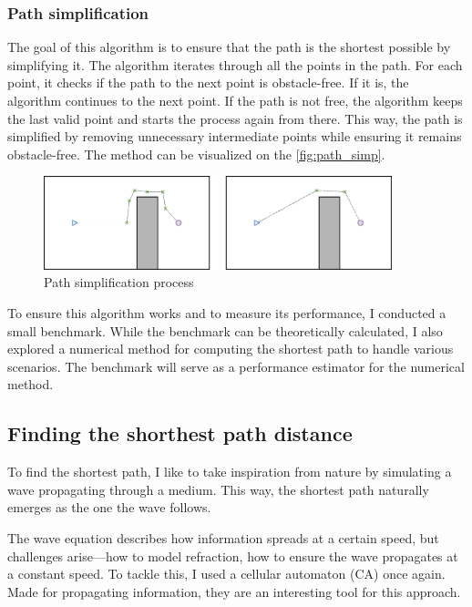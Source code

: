 \documentclass[../main.tex]{subfiles}
\begin{document}
\subsubsection{Path simplification}

The goal of this algorithm is to ensure that the path is the shortest possible by simplifying it. The algorithm iterates through all the points in the path. For each point, it checks if the path to the next point is obstacle-free. If it is, the algorithm continues to the next point. If the path is not free, the algorithm keeps the last valid point and starts the process again from there. This way, the path is simplified by removing unnecessary intermediate points while ensuring it remains obstacle-free. The method can be visualized on the \autoref{fig:path_simp}.

\begin{figure}[H]
	\centering
	\includegraphics[width=0.9\textwidth]{IMAGES/part3/shorten_path.png}
	\caption{Path simplification process}
	\label{fig:path_simp}
\end{figure}

To ensure this algorithm works and to measure its performance, I conducted a small benchmark. While the benchmark can be theoretically calculated, I also explored a numerical method for computing the shortest path to handle various scenarios. The benchmark will serve as a performance estimator for the numerical method.

\subsection{Finding the shorthest path distance}
To find the shortest path, I like to take inspiration from nature by simulating a wave propagating through a medium. This way, the shortest path naturally emerges as the one the wave follows.  

\vspace{1em}

The wave equation describes how information spreads at a certain speed, but challenges arise—how to model refraction, how to ensure the wave propagates at a constant speed. To tackle this, I used a cellular automaton (CA) once again. Made for propagating information, they are an interesting tool for this approach.\cite{tapia_2016}
\end{document}
